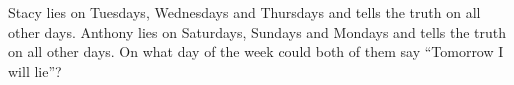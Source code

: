 Stacy lies on Tuesdays, Wednesdays and Thursdays and tells the truth on all other days. Anthony lies on Saturdays, Sundays and Mondays and tells the truth on all other days. On what day of the week could both of them say ``Tomorrow I will lie''?
